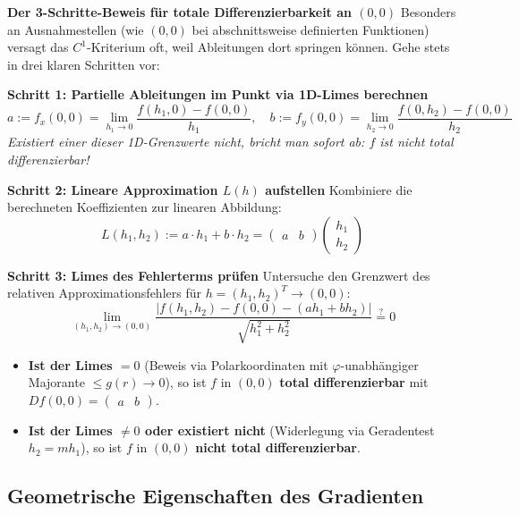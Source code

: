 \begin{example}
    \textbf{Der 3-Schritte-Beweis für totale Differenzierbarkeit an $(0,0)$}
    Besonders an Ausnahmestellen (wie $(0,0)$ bei abschnittsweise definierten Funktionen) versagt das $C^1$-Kriterium oft, weil Ableitungen dort springen können. Gehe stets in drei klaren Schritten vor:

    \textbf{Schritt 1: Partielle Ableitungen im Punkt via 1D-Limes berechnen}
    $$ a := f_x(0,0) = \lim_{h_1 \to 0} \frac{f(h_1, 0) - f(0,0)}{h_1}, \quad b := f_y(0,0) = \lim_{h_2 \to 0} \frac{f(0, h_2) - f(0,0)}{h_2} $$
    \textit{Existiert einer dieser 1D-Grenzwerte nicht, bricht man sofort ab: $f$ ist nicht total differenzierbar!}

    \textbf{Schritt 2: Lineare Approximation $L(h)$ aufstellen}
    Kombiniere die berechneten Koeffizienten zur linearen Abbildung:
    $$ L(h_1, h_2) := a \cdot h_1 + b \cdot h_2 = \begin{pmatrix} a & b \end{pmatrix} \begin{pmatrix} h_1 \\ h_2 \end{pmatrix} $$

    \textbf{Schritt 3: Limes des Fehlerterms prüfen}
    Untersuche den Grenzwert des relativen Approximationsfehlers für $h = (h_1, h_2)^T \to (0,0)$:
    $$ \lim_{(h_1, h_2) \to (0,0)} \frac{\big| f(h_1, h_2) - f(0,0) - (a h_1 + b h_2) \big|}{\sqrt{h_1^2 + h_2^2}} \stackrel{?}{=} 0 $$
    \begin{itemize}
        \item \textbf{Ist der Limes $= 0$} (Beweis via Polarkoordinaten mit $\varphi$-unabhängiger Majorante $\le g(r) \to 0$), so ist $f$ in $(0,0)$ \textbf{total differenzierbar} mit $Df(0,0) = \begin{pmatrix} a & b \end{pmatrix}$.
        \item \textbf{Ist der Limes $\neq 0$ oder existiert nicht} (Widerlegung via Geradentest $h_2 = m h_1$), so ist $f$ in $(0,0)$ \textbf{nicht total differenzierbar}.
    \end{itemize}
\end{example}

\subsection{Geometrische Eigenschaften des Gradienten}

